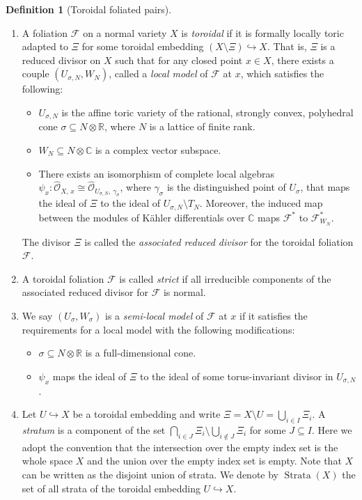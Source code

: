\documentclass[12pt,reqno]{amsart}
\theoremstyle{definition}
\newtheorem{definition}[theorem]{Definition}
\newcommand{\on}{\operatorname}
\newcommand\cF{{\mathcal{F}}}
\newcommand\cO{{\mathcal{O}}}
\newcommand\bC{{\mathbb C}}
\newcommand\bR{{\mathbb R}}
\begin{document}
\begin{definition}[Toroidal foliated pairs]\label{defn_toroidal}\hspace{1em}
    \begin{enumerate}
         \item A foliation $\cF$ on a normal variety $X$ is \emph{toroidal} if it is formally locally toric adapted to $\Xi$ for some toroidal embedding $(X\setminus\Xi)\hookrightarrow X$. 
        That is, $\Xi$ is a reduced divisor on $X$ such that for any closed point $x\in X$, there exists a couple $(U_{\sigma,N},W_N)$, called a \emph{local model} of $\mathcal F$ at $x$, which satisfies the following:
        \begin{itemize}
            \item $U_{\sigma,N}$ is the affine toric variety of the rational, strongly convex, polyhedral cone $\sigma\subseteq N\otimes\bR$, where $N$ is a lattice of finite rank.
            \item $W_N\subseteq N\otimes\bC$ is a complex vector subspace. 
            \item There exists an isomorphism of complete local algebras $\psi_x\colon \widehat{\cO}_{X,\,x}\cong\widehat{\cO}_{U_{\sigma,N},\,\gamma_\sigma}$, where $\gamma_\sigma$ is the distinguished point of $U_\sigma$, that maps the ideal of $\Xi$ to the ideal of $U_{\sigma,N}\setminus T_N$. Moreover,  the induced map between the modules of Kähler differentials over $\bC$ maps $\cF^*$ to $\cF_{W_N}^*$.
        \end{itemize} 
    The divisor $\Xi$ is called the \emph{associated reduced divisor} for the toroidal foliation $\cF$. 
    \item A toroidal foliation $\cF$ is called \emph{strict} if all irreducible components of the associated reduced divisor for $\cF$ is normal. 

    \item We say $(U_\sigma,W_\sigma)$ is a \emph{semi-local model} of $\mathcal F$ at $x$ if it satisfies the requirements for a local model with the following modifications:
    \begin{itemize}
        \item $\sigma\subseteq N\otimes\bR$ is a full-dimensional cone.
        \item $\psi_x$ maps the ideal of $\Xi$ to the ideal of some torus-invariant divisor in $U_{\sigma,N}$.
    \end{itemize} 

    \item Let $U\hookrightarrow X$ be a toroidal embedding and write $\Xi=X\setminus U=\bigcup_{i\in I}\Xi_i$. A \emph{stratum} is a component of the set $\bigcap_{i\in J}\Xi_i\setminus\bigcup_{i\notin J}\Xi_i$ for some $J\subseteq I$. Here we adopt the convention that the intersection over the empty index set is the whole space $X$ and the union over the empty index set is empty. Note that $X$ can be written as the disjoint union of strata. 
    We denote by $\on{Strata}(X)$ the set of all strata of the toroidal embedding $U\hookrightarrow X$. 


\end{enumerate}
\end{definition}
\end{document}

